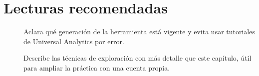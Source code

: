 \section{Lecturas recomendadas}

\begin{description}
  \item[\textcite{google2026ga4ua}] Aclara qué generación de la herramienta
  está vigente y evita usar tutoriales de Universal Analytics por error.
  \item[\textcite{google2026ga4explorar}] Describe las técnicas de exploración
  con más detalle que este capítulo, útil para ampliar la práctica con una
  cuenta propia.
\end{description}
